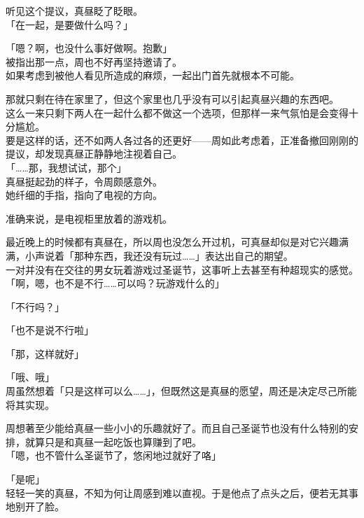 听见这个提议，真昼眨了眨眼。\\

「在一起，是要做什么吗？」

「嗯？啊，也没什么事好做啊。抱歉」\\

被指出那一点，周也不好再坚持邀请了。\\

如果考虑到被他人看见所造成的麻烦，一起出门首先就根本不可能。

那就只剩在待在家里了，但这个家里也几乎没有可以引起真昼兴趣的东西吧。\\

这么一来只剩下两人在一起什么都不做这一个选项，但那样一来气氛怕是会变得十分尴尬。\\

要是这样的话，还不如两人各过各的还更好——周如此考虑着，正准备撤回刚刚的提议，却发现真昼正静静地注视着自己。\\%

「……那，我想试试，那个」\\

真昼挺起劲的样子，令周颇感意外。\\

她纤细的手指，指向了电视的方向。

准确来说，是电视柜里放着的游戏机。

最近晚上的时候都有真昼在，所以周也没怎么开过机，可真昼却似是对它兴趣满满，小声说着「那种东西，我还没有玩过……」表达出自己的期望。\\%

一对并没有在交往的男女玩着游戏过圣诞节，这事听上去甚至有种超现实的感觉。\\

「啊，嗯，也不是不行……可以吗？玩游戏什么的」

「不行吗？」

「也不是说不行啦」

「那，这样就好」

「哦、哦」\\

周虽然想着「只是这样可以么……」，但既然这是真昼的愿望，周还是决定尽己所能将其实现。

周想著至少能给真昼一些小小的乐趣就好了。而且自己圣诞节也没有什么特别的安排，就算只是和真昼一起吃饭也算赚到了吧。\\

「嗯，也不管什么圣诞节了，悠闲地过就好了咯」

「是呢」\\

轻轻一笑的真昼，不知为何让周感到难以直视。于是他点了点头之后，便若无其事地别开了脸。

